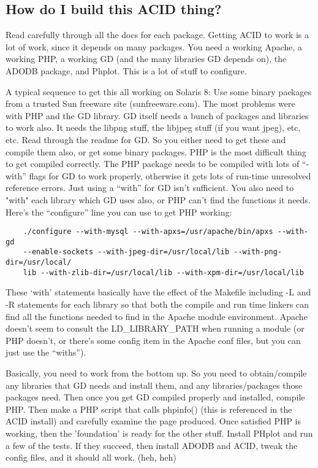 \documentclass{article}
\begin{document}

\subsection{How do I build this ACID thing?}

Read carefully through all the docs for each package. Getting ACID to work is a
lot of work, since it depends on many packages. You need a working Apache, a
working PHP, a working GD (and the many libraries GD depends on), the ADODB
package, and Phplot. This is a lot of stuff to configure.

A typical sequence to get this all working on Solaris 8: Use some binary
packages from a trusted Sun freeware site (sunfreeware.com). The most problems
were with PHP and the GD library. GD itself needs a bunch of packages and
libraries to work also. It needs the libpng stuff, the libjpeg stuff (if you
want jpeg), etc, etc. Read through the readme for GD. So you either need to get
these and compile them also, or get some binary packages. PHP is the most
difficult thing to get compiled correctly. The PHP package needs to be compiled
with lots of ``-with'' flags for GD to work properly, otherwise it gets lots of
run-time unresolved reference errors. Just using a ``with'' for GD isn't
sufficient. You also need to "with" each library which GD uses also, or PHP
can't find the functions it needs. Here's the ``configure'' line you can use to
get PHP working:
\begin{verbatim}
    ./configure --with-mysql --with-apxs=/usr/apache/bin/apxs --with-gd
    --enable-sockets --with-jpeg-dir=/usr/local/lib --with-png-dir=/usr/local/
    lib --with-zlib-dir=/usr/local/lib --with-xpm-dir=/usr/local/lib
\end{verbatim}
 These `with' statements basically have the effect of the Makefile including -L
and -R statements for each library so that both the compile and run time
linkers can find all the functions needed to find in the Apache module
environment. Apache doesn't seem to consult the LD\_LIBRARY\_PATH when running a
module (or PHP doesn't, or there's some config item in the Apache conf files,
but you can just use the ``withs'').

Basically, you need to work from the bottom up. So you need to obtain/compile
any libraries that GD needs and install them, and any libraries/packages those
packages need. Then once you get GD compiled properly and installed, compile
PHP. Then make a PHP script that calls phpinfo() (this is referenced in the
ACID install) and carefully examine the page produced. Once satisfied PHP is
working, then the 'foundation' is ready for the other stuff. Install PHplot and
run a few of the tests. If they succeed, then install ADODB and ACID, tweak the
config files, and it should all work. (heh, heh)
\end{document}
